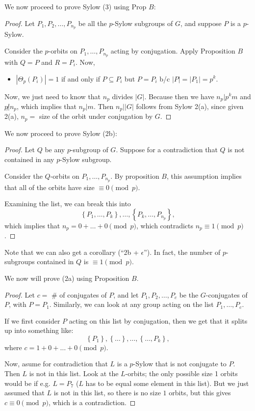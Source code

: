\documentclass[12pt]{article}
\begin{document}
We now proceed to prove Sylow (3) using Prop $B$:

\begin{proof}
  Let $P_1, P_2, \dots, P_{n_p}$ be all the $p$-Sylow subgroups of $G$, and suppose $P$ is a $p$-Sylow.

  Consider the $p$-orbits on $P_1, \dots, P_{n_p}$ acting by conjugation.  Apply Proposition $B$ with $Q = P$ and $R = P_i$.   Now, 
  \begin{itemize}
    \item $| \Theta_p (P_i)| = 1$ if and only if $P \subseteq P_i$ but $P = P_i$ b/c $|P| = |P_1| = p^k$.
  \end{itemize}

  Now, we just need to know that $n_p$ divides $|G|$.  Because then we have $n_p | p^{k} m$ and $p \not | n_p$, which implies that $n_p | m$.  Then $n_p | |G|$ follows from Sylow 2(a), since given 2(a), $n_p = $ size of the orbit under conjugation by $G$.
\end{proof}

We now proceed to prove Sylow (2b):

\begin{proof}
  Let $Q$ be any $p$-subgroup of $G$.  Suppose for a contradiction that $Q$ is not contained in any $p$-Sylow subgroup.

  Consider the $Q$-orbits on $P_1, \dots, P_{n_p}$.  By proposition $B$, this assumption implies that all of the orbits have size $\equiv 0 \pmod{p}$.

  Examining the list, we can break this into
  \[
    \left\{ P_1, \dots, P_k \right\}, \dots, \left\{ P_k, \dots, P_{n_p} \right\},
  \]
  which implies that $n_p = 0 + \dots + 0 \pmod{p}$, which contradicts $n_p \equiv 1 \pmod{p}$.
\end{proof}

Note that we can also get a corollary (``2b + $\epsilon$'').  In fact, the number of $p$-subgroups contained in $Q$ is $\equiv 1 \pmod{p}$.

We now will prove (2a) using Proposition $B$.

\begin{proof}
  Let $c = $ # of conjugates of $P$, and let $P_1, P_2, \dots, P_c$ be the $G$-conjugates of $P$, with $P = P_1$.  Similarly, we can look at any group acting on the list $P_1, \dots, P_c$.

  If we first consider $P$ acting on this list by conjugation, then we get that it splits up into something like:
  \[
    \left\{ P_1 \right\}, \left\{ \dots \right\}, \dots, \left\{ \dots, P_k \right\},
  \]
  where $c = 1 + 0 + \dots + 0 \pmod{p}$.

  Now, asume for contradiction that $L$ is a $p$-Sylow that is not conjugate to $P$.  Then $L$ is not in this list.  Look at the $L$-orbits; the only possible size 1 orbits would be if e.g. $L = P_7$ ($L$ has to be equal some element in this list).  But we just assumed that $L$ is not in this list, so there is no size $1$ orbits, but this gives $c \equiv 0 \pmod{p}$, which is a contradiction.
\end{proof}
\end{document}
